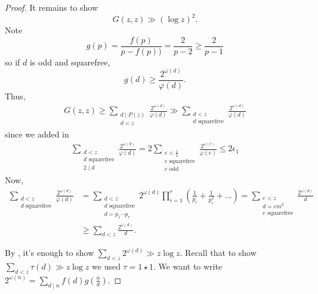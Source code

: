 \documentclass{article}
\begin{document}
\begin{proof}
  \newlec
  It remains to show
  \begin{equation*}
    G(z,z) \gg (\log z)^2.
  \end{equation*}
  Note
  \begin{equation*}
  g(p) = \frac{f(p)}{p-f(p))} = \frac{2}{p-2} \geq \frac{2}{p-1}
  \end{equation*}
  so if $d$ is odd and squarefree,
  \begin{equation*}
    g(d) \geq \frac{2^{\omega(d)}}{\varphi(d)}.
  \end{equation*}
  Thus,
  \begin{align*}
    G(z,z) \geq \sum_{\substack{d \mid P(z) \\ d < z}}
    \frac{2^{\omega(d)}}{\varphi(d)} \gg
    \sum_{\substack{d < z \\ d \text{ squarefree}}}
      \frac{2^{\omega(d)}}{\varphi(d)}
  \end{align*}
  since we added in
  \begin{align*}
    \sum_{\substack{d < z \\ d \text{ squarefree} \\ 2 \mid d}} \frac{2^{\omega(d)}}{\varphi(d)} = 2 \sum_{\substack{e < \frac{z}{2} \\ e \text{ squarefree} \\ e \text{ odd}}} \frac{2^{\omega(e)}}{\varphi(e)} \leq 2 \epsilon_1
  \end{align*}
  Now,
  \begin{align*}
    \sum_{\substack{d < z \\ d \text{ squarefree}}} \frac{2^{\omega(d)}}{\varphi(d)} &= \sum_{\substack{d < z \\ d \text{ squarefree} \\ d = p_1 \dotsm p_r}} 2^{\omega(d)} \prod_{i=1}^r \left(\frac{1}{p_i} + \frac{1}{p_i^2} + \dots\right) = \sum_{\substack{e < z \\ d = em^2 \\ e \text{ squarefree}}} \frac{2^{\omega(d)}}{d} \\
                                                                                   &\geq \sum_{d < z} \frac{2^{\omega(d)}}{d}.
  \end{align*}

  By , it's enough to show $\sum_{d < z} 2^{\omega(d)} \gg z \log z$.
  Recall that to show $\sum_{d < z} \tau(d) \gg z \log z$ we used $\tau = 1 \star 1$.
  We want to write $2^{\omega(n)} = \sum_{d \mid n} f(d) g(\tfrac{n}{d})$.


\end{proof}
\end{document}
